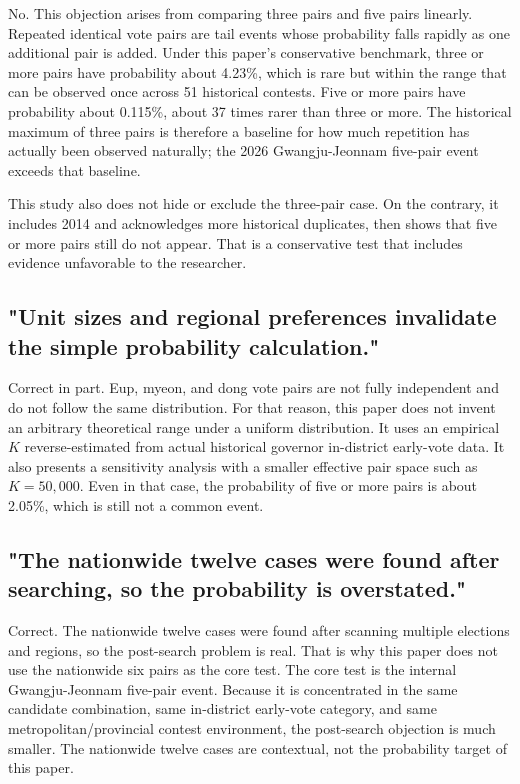 \documentclass[preprint]{IEIE}
\begin{document}
No. This objection arises from comparing three pairs and five pairs linearly. Repeated identical vote pairs are tail events whose probability falls rapidly as one additional pair is added. Under this paper's conservative benchmark, three or more pairs have probability about 4.23\%, which is rare but within the range that can be observed once across 51 historical contests. Five or more pairs have probability about 0.115\%, about 37 times rarer than three or more. The historical maximum of three pairs is therefore a baseline for how much repetition has actually been observed naturally; the 2026 Gwangju-Jeonnam five-pair event exceeds that baseline.

This study also does not hide or exclude the three-pair case. On the contrary, it includes 2014 and acknowledges more historical duplicates, then shows that five or more pairs still do not appear. That is a conservative test that includes evidence unfavorable to the researcher.

\subsection{"Unit sizes and regional preferences invalidate the simple probability calculation."}

Correct in part. Eup, myeon, and dong vote pairs are not fully independent and do not follow the same distribution. For that reason, this paper does not invent an arbitrary theoretical range under a uniform distribution. It uses an empirical \(K\) reverse-estimated from actual historical governor in-district early-vote data. It also presents a sensitivity analysis with a smaller effective pair space such as \(K=50,000\). Even in that case, the probability of five or more pairs is about 2.05\%, which is still not a common event.

\subsection{"The nationwide twelve cases were found after searching, so the probability is overstated."}

Correct. The nationwide twelve cases were found after scanning multiple elections and regions, so the post-search problem is real. That is why this paper does not use the nationwide six pairs as the core test. The core test is the internal Gwangju-Jeonnam five-pair event. Because it is concentrated in the same candidate combination, same in-district early-vote category, and same metropolitan/provincial contest environment, the post-search objection is much smaller. The nationwide twelve cases are contextual, not the probability target of this paper.
\end{document}
